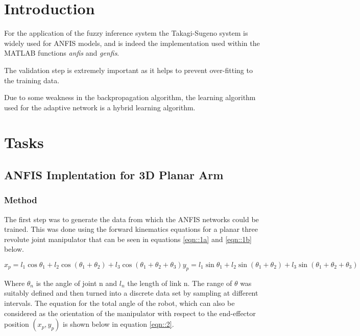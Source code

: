 \documentclass[a4paper, oneside, 12pt]{article}
\begin{document}
\section{Introduction}
For the application of the fuzzy inference system the Takagi-Sugeno system is widely used for ANFIS models, and is indeed the implementation used within the MATLAB functions \textit{anfis} and \textit{genfis}.

The validation step is extremely important as it helps to prevent over-fitting to the training data.

Due to some weakness in the backpropagation algorithm, the learning algorithm used for the adaptive network is a hybrid learning algorithm.


\cite{Jang1993}

\newpage
\section{Tasks}
\subsection{ANFIS Implentation for 3D Planar Arm}
\subsubsection{Method}

The first step was to generate the data from which the ANFIS networks could be trained. This was done using the forward kinematics equations for a planar three revolute joint manipulator that can be seen in equations \ref{eqn::1a} and \ref{eqn::1b} below.

\begin{subequations}
	\begin{equation}
		x_p = l_1 \cos \theta_1 + l_2 \cos (\theta_1 + \theta_2) + l_3 \cos ( \theta_1 + \theta_2 + \theta_3)
		\label{eqn::1a}
	\end{equation}
	\begin{equation}
		y_p = l_1 \sin \theta_1 + l_2 \sin (\theta_1 + \theta_2) + l_3 \sin ( \theta_1 + \theta_2 + \theta_3)
		\label{eqn::1b}
	\end{equation}
\end{subequations}

Where $\theta_n$ is the angle of joint n and $l_n$ the length of link n. The range of $\theta$ was suitably defined and then turned into a discrete data set by sampling at different intervals. The equation for the total angle of the robot, which can also be considered as the orientation of the manipulator with respect to the end-effector position $(x_p , y_p )$ is shown below in equation \ref{eqn::2}.
\end{document}
